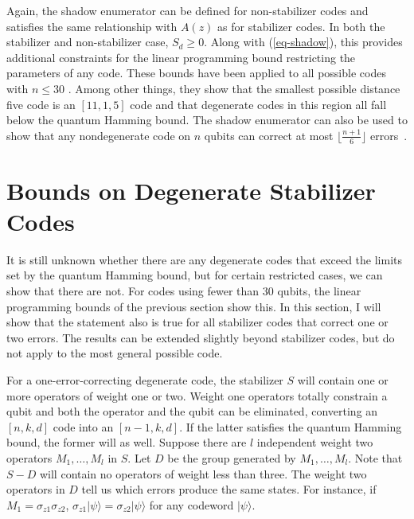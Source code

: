 \documentclass{report}
\newcommand{\ket}[1]{|{#1}\rangle}
\newcommand{\Zs}[1]{\sigma_{z{#1}}}
\begin{document}
Again, the shadow enumerator can be defined for non-stabilizer codes and 
satisfies the same relationship with $A(z)$ as for stabilizer codes.  In both 
the stabilizer and non-stabilizer case, $S_d \geq 0$.  Along with 
(\ref{eq-shadow}), this provides additional constraints for the linear 
programming bound restricting the parameters of any code.  These bounds 
have been applied to all possible codes with $n \leq 30$
\cite{rains-shadow,calderbank-GF4}.  Among other things, they show that 
the smallest possible distance five code is an $[11,1,5]$ code and that 
degenerate codes in this region all fall below the quantum Hamming 
bound.  The shadow enumerator can also be used to show that any nondegenerate
code on $n$ qubits can correct at most $\lfloor \frac{n+1}{6} \rfloor$
errors~\cite{rains-shadow}.

\section{Bounds on Degenerate Stabilizer Codes}

It is still unknown whether there are any degenerate codes that exceed the 
limits set by the quantum Hamming bound, but for certain restricted cases, 
we can show that there are not.  For codes using fewer than 30 qubits, the 
linear programming bounds of the previous section show this.  In this 
section, I will show that the statement also is true for all stabilizer codes 
that correct one or two errors.  The results can be extended slightly 
beyond stabilizer codes, but do not apply to the most general possible code.

For a one-error-correcting degenerate code, the stabilizer $S$ will contain 
one or more operators of weight one or two.  Weight one operators totally 
constrain a qubit and both the operator and the qubit can be eliminated, 
converting an $[n, k, d]$ code into an $[n-1, k, d]$.  If the latter satisfies 
the quantum Hamming bound, the former will as well.  Suppose there are $l$ 
independent weight two operators $M_1, \ldots, M_l$ in $S$.  Let $D$ be the 
group generated by $M_1, \ldots, M_l$.  Note that $S - D$ will contain no 
operators of weight less than three.  The weight two operators in $D$ tell us 
which errors produce the same states.  For instance, if $M_1 = \Zs{1} \Zs{2}$, 
$\Zs{1} \ket{\psi} = \Zs{2} \ket{\psi}$ for any codeword $\ket{\psi}$.
\end{document}

